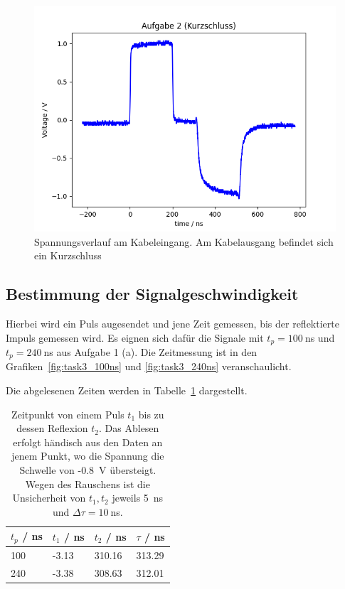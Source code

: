 \documentclass{article}
\begin{document}
\begin{figure}[H]
\centering
\caption{Spannungsverlauf am Kabeleingang. Am Kabelausgang befindet sich ein Kurzschluss}
\label{fig:task2_kurz}
\includegraphics[scale=0.6]{bilder/task2/task2_kurz.png}
\end{figure}




\subsection{Bestimmung der Signalgeschwindigkeit}

Hierbei wird ein Puls augesendet und jene Zeit gemessen, bis der reflektierte Impuls gemessen wird. Es eignen sich dafür die Signale mit $t_p=100~$ns und $t_p=240~$ns aus Aufgabe 1 (a). Die Zeitmessung ist in den Grafiken~\ref{fig:task3_100ns} und \ref{fig:task3_240ns} veranschaulicht.

Die abgelesenen Zeiten werden in Tabelle~\ref{tab:task3_zeiten} dargestellt.
\begin{table}[H]
\caption{Zeitpunkt von einem Puls $t_1$ bis zu dessen Reflexion $t_2$. Das Ablesen erfolgt händisch aus den Daten an jenem Punkt, wo die Spannung die Schwelle von -0.8~V übersteigt. Wegen des Rauschens ist die Unsicherheit von $t_1,t_2$ jeweils 5~ns und $\Delta \tau = 10~$ns.}
\label{tab:task3_zeiten}
\begin{tabular}{l|lll}
$t_p$ / ns & $t_1$ / ns & $t_2$ / ns & $\tau$ / ns  \\
\hline
100 &  -3.13 & 310.16 & 313.29 \\
240 &  -3.38 & 308.63 & 312.01
\end{tabular}
\end{table}
\end{document}
